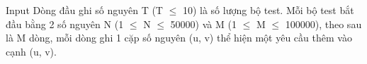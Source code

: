Input
Dòng đầu ghi số nguyên T (T  $\le$  10) là số lượng bộ test. Mỗi bộ test bắt đầu bằng 2 số nguyên N (1  $\le$  N  $\le$  50000) và M (1  $\le$  M  $\le$  100000), theo sau là M dòng, mỗi dòng ghi 1 cặp số nguyên (u, v) thể hiện một yêu cầu thêm vào cạnh (u, v).